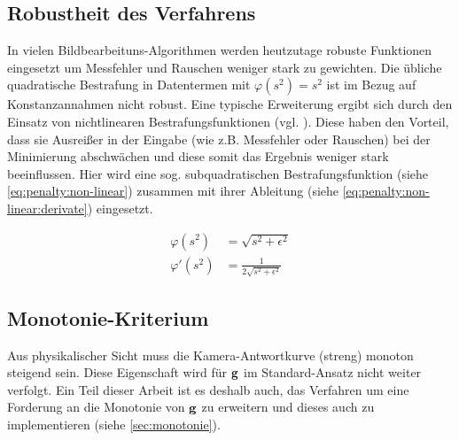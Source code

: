 \subsection{Robustheit des Verfahrens}
\label{algo:schwachstellen:robustheit}
In vielen Bildbearbeituns-Algorithmen werden heutzutage robuste Funktionen eingesetzt um Messfehler und Rauschen weniger stark zu gewichten. Die übliche quadratische Bestrafung in Datentermen mit $\varphi(s^2) = s^2$ ist im Bezug auf Konstanzannahmen nicht robust. Eine typische Erweiterung ergibt sich durch den Einsatz von nichtlinearen Bestrafungsfunktionen (vgl. \cite[S. 9f, S. 87f]{bruhn06}). Diese haben den Vorteil, dass sie Ausreißer in der Eingabe (wie z.B. Messfehler oder Rauschen) bei der Minimierung abschwächen und diese somit das Ergebnis weniger stark beeinflussen. Hier wird eine sog. subquadratischen Bestrafungsfunktion (siehe \autoref{eq:penalty:non-linear}) zusammen mit ihrer Ableitung (siehe \autoref{eq:penalty:non-linear:derivate}) eingesetzt.

\begin{align}
\label{eq:penalty:non-linear}
\varphi(s^2) &= \sqrt{s^2 + \epsilon^2}\\
\label{eq:penalty:non-linear:derivate}
\varphi'(s^2) &= \frac{1}{2\sqrt{s^2 + \epsilon^2}}
\end{align}

\subsection{Monotonie-Kriterium}
\label{algo:schwachstellen:monotonie}
Aus physikalischer Sicht muss die Kamera-Antwortkurve (streng) monoton steigend sein. Diese Eigenschaft wird für $\mathbf g$ im Standard-Ansatz nicht weiter verfolgt. Ein Teil dieser Arbeit ist es deshalb auch, das Verfahren um eine Forderung an die Monotonie von $\mathbf g$ zu erweitern und dieses auch zu implementieren (siehe \autoref{sec:monotonie}).
